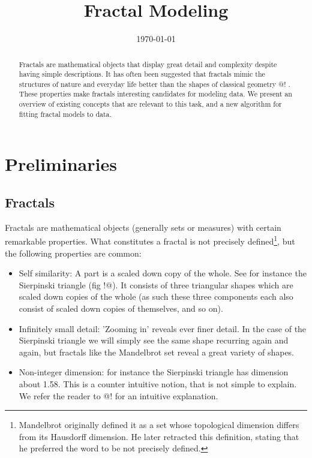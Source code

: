 \documentclass[11pt]{article}
\title{Fractal Modeling}
\date{\today}
\theoremstyle{definition}
\begin{document}
\maketitle

\begin{abstract}
\noindent Fractals are mathematical objects that display great detail and complexity despite having simple descriptions. It has often been suggested that fractals mimic the structures of nature and everyday life better than the shapes of classical geometry @! \cite{}. These properties make fractals interesting candidates for modeling data. We present an overview of existing concepts that are relevant to this task, and a new algorithm for fitting fractal models to data. 
\end{abstract}


\section{Preliminaries}
\subsection{Fractals}

Fractals are mathematical objects (generally sets or measures) with certain remarkable properties. What constitutes a fractal is not precisely defined\footnote{Mandelbrot originally defined it as a set whose topological dimension differs from its Hausdorff dimension. He later retracted this definition, stating that he preferred the word to be not precisely defined.}, but the following properties are common:


\begin{itemize}
  \item Self similarity: A part is a scaled down copy of the whole. See for instance the Sierpinski triangle (fig !@). It consists of three triangular shapes which are scaled down copies of the whole (as such these three components each also consist of scaled down copies of themselves, and so on).
  \item Infinitely small detail: 'Zooming in' reveals ever finer detail. In the case of the Sierpinski triangle we will simply see the same shape recurring again and again, but fractals like the Mandelbrot set reveal a great variety of shapes.
  \item Non-integer dimension: for instance the Sierpinski triangle has dimension about 1.58. This is a counter intuitive notion, that is not simple to explain. We refer the reader to @! for an intuitive explanation.
\end{itemize}
\end{document}
